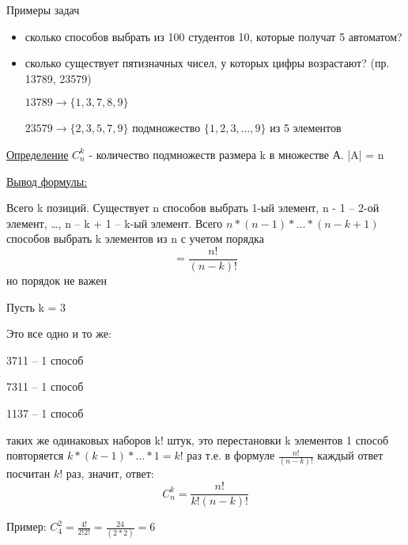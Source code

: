 \documentclass{article}
\begin{document}
Примеры задач

\begin{itemize}
    \item сколько способов выбрать из 100 студентов 10, которые получат 5 автоматом?
\item сколько существует пятизначных чисел, у которых цифры возрастают? (пр. 13789, 23579)

$13789 \rightarrow \{1, 3, 7, 8, 9\}$

$23579 \rightarrow \{2, 3, 5, 7, 9\}$ подмножество $\{1, 2, 3, …, 9\}$ из 5 элементов
\end{itemize}
 
 \underline{Определение}
 $C_n^k$ - количество подмножеств размера k в множестве А.  |A| = n
 
\underline{Вывод формулы:}

Всего k позиций. Существует n способов выбрать 1-ый элемент,  n - 1 – 2-ой элемент, …, n – k + 1 – k-ый элемент.
Всего $n \ast (n-1) \ast \dots \ast (n-k + 1)$ способов выбрать k элементов из n с учетом порядка $$= \frac{n!}{(n-k)!}$$ но порядок не важен

Пусть k = 3

Это все одно и то же:

3711 – 1 способ 

7311 – 1 способ 

1137 – 1 способ 

таких же одинаковых наборов k! штук, это перестановки k элементов
1 способ повторяется $k \ast (k-1) \ast \dots \ast 1 = k!$ раз
т.е. в формуле $\frac{n!}{(n-k)!}$ каждый ответ посчитан $k!$ раз, значит, ответ: $$C_n^k = \frac{n!}{k!(n-k)!}$$

Пример: $C_4^2 = \frac{4!}{2!2!} = \frac{24}{(2 \ast 2)}=6$
\end{document}
